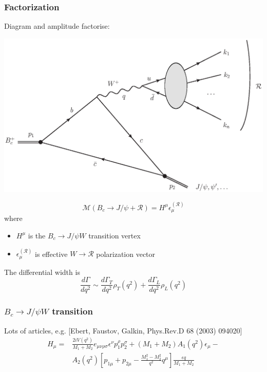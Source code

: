 \documentclass{beamer}
\newcommand{\R}{\mathcal{R}}
\newcommand{\M}{\mathcal{M}}
\begin{document}
\begin{frame}[t]
  \frametitle{Factorization}
  Diagram and amplitude factorise:
  \begin{center}
    \includegraphics[width=0.5\columnwidth]{diags_BcCCW}
  \end{center}
      $$\M\left(B_c \to J/\psi + \R\right) = H^\mu \epsilon^{(\R)}_\mu$$
   where
   \begin{itemize}
   \item $H^\mu$ is the $B_c\to J/\psi W$ transition vertex
   \item $\epsilon^{(\R)}_\mu$ is effective  $W\to\R$ polarization vector
   \end{itemize}
The differential width is
$$
\frac{d\Gamma}{dq^2} \sim \frac{d\Gamma_T}{dq^2} \rho_T\left(q^2\right) + \frac{d\Gamma_L}{dq^2} \rho_L\left(q^2\right)
$$
\end{frame}


\begin{frame}
  \frametitle{$B_c \to J/\psi W$ transition}
  Lots of articles, e.g. [Ebert, Faustov, Galkin,     Phys.Rev.D 68 (2003) 094020]
  \begin{align*}
    \label{eq:1}
    H_\mu =& \frac{2i V(q^2)}{M_1+M_2}e_{\mu\nu\rho\sigma}\epsilon^\nu p_1^\rho p_2^\sigma
             + (M_1+M_2) A_1(q^2)\epsilon_\mu - \\
     & A_2(q^2) \left[p_{1\mu} + p_{2\mu}-\frac{M_1^2-M_2^2}{q^2}q^\mu\right]\frac{\epsilon q}{M_1+M_2}
  \end{align*}
\end{frame}
\end{document}
